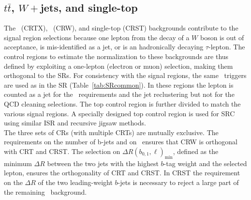 %

\subsection{\boldmath$t\bar{t}$, \boldmath$W+$jets, and single-top}
\label{sec:1leptonCR}

The \ttbar\ (CRTX), \Wjets\ (CRW), and single-top (CRST)  backgrounds contribute to the signal region selections because one lepton from the decay of a $W$ boson is out of acceptance, is mis-identified as a jet, or is an hadronically decaying $\tau$-lepton. The control regions to estimate the normalization to these backgrounds are thus defined by exploiting a one-lepton (electron or muon) selection, making them orthogonal to the SRs. For consistency with the signal regions, the same \met\ triggers are used as in the SR (Table~\ref{tab:SRcommon}). In these regions the lepton is counted as a jet for the \pt\ requirements and the jet reclustering but not for the QCD cleaning selections. The top control region is further divided to match the various signal regions. A specially designed top control region is used for SRC using similar ISR and recursive jigsaw methods. \\


The three sets of CRs (with multiple CRTs) are mutually exclusive. The requirements on the number of b-jets and on \mantikttwelvezero\ ensures that CRW is orthogonal with CRT and CRST. The selection on $\Delta R(b_{0,1},\ell)_{\mathrm{min}}$, defined as the minimum $\Delta R$ between the two jets with the highest $b$-tag weight and the selected lepton, ensures the orthogonality of CRT and CRST. In CRST the requirement on the $\Delta R$ of the two leading-weight $b$-jets is necessary to reject a large part of the remaining \ttbar\ background.\\%

